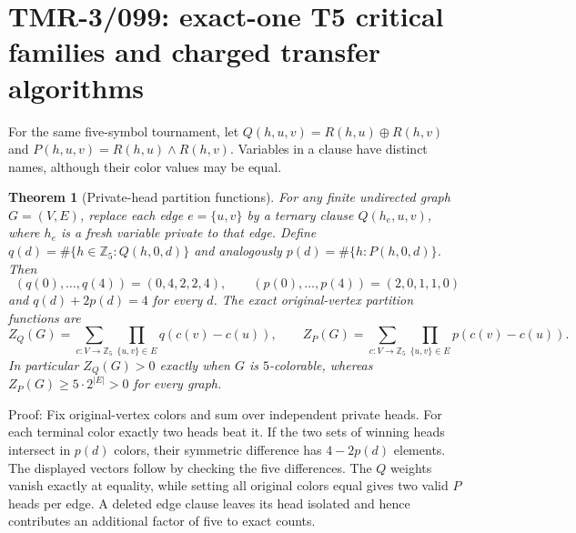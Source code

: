 \documentclass[11pt]{article}
\newtheorem{theorem}{Theorem}
\begin{document}
\section{TMR-3/099: exact-one T5 critical families and charged transfer algorithms}

For the same five-symbol tournament, let
$Q(h,u,v)=R(h,u)\oplus R(h,v)$ and
$P(h,u,v)=R(h,u)\wedge R(h,v)$.
Variables in a clause have distinct names, although their color
values may be equal.

\begin{theorem}[Private-head partition functions]
For any finite undirected graph $G=(V,E)$, replace each edge
$e=\{u,v\}$ by a ternary clause $Q(h_e,u,v)$, where $h_e$ is a
fresh variable private to that edge. Define
$q(d)=\#\{h\in\mathbb Z_5:Q(h,0,d)\}$ and analogously
$p(d)=\#\{h:P(h,0,d)\}$. Then
\[
(q(0),\ldots,q(4))=(0,4,2,2,4),\qquad
(p(0),\ldots,p(4))=(2,0,1,1,0)
\]
and $q(d)+2p(d)=4$ for every $d$. The exact original-vertex
partition functions are
\[
Z_Q(G)=\sum_{c:V\to\mathbb Z_5}
 \prod_{\{u,v\}\in E}q(c(v)-c(u)),\qquad
Z_P(G)=\sum_{c:V\to\mathbb Z_5}
 \prod_{\{u,v\}\in E}p(c(v)-c(u)).
\]
In particular $Z_Q(G)>0$ exactly when $G$ is $5$-colorable,
whereas $Z_P(G)\geq 5\cdot2^{|E|}>0$ for every graph.
\end{theorem}
\noindent
Proof: Fix original-vertex colors and sum over independent
private heads. For each terminal color exactly two heads beat
it. If the two sets of winning heads intersect in $p(d)$ colors,
their symmetric difference has $4-2p(d)$ elements. The
displayed vectors follow by checking the five differences.
The $Q$ weights vanish exactly at equality, while setting
all original colors equal gives two valid $P$ heads per edge.
A deleted edge clause leaves its head isolated and hence
contributes an additional factor of five to exact counts.
\end{document}
